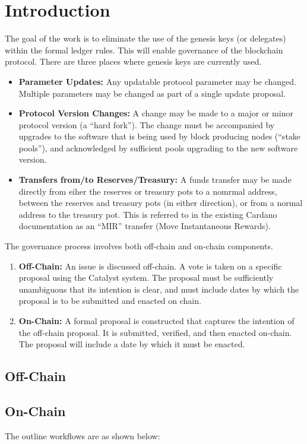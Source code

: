 \section{Introduction}

The goal of the work is to eliminate the use of the genesis keys (or delegates) within the formal ledger rules.  This will enable
governance of the blockchain protocol.   There are three places where genesis keys are currently used.


\begin{itemize}
\item
  \textbf{Parameter Updates:}
  Any updatable protocol parameter may be changed.  Multiple parameters may be changed as part of a single update proposal.
\item
  \textbf{Protocol Version Changes:}
  A change may be made to a major or minor protocol version (a ``hard fork'').  The change must be accompanied by upgrades to
  the software that is being used by block producing nodes (``stake pools''), and acknowledged by sufficient pools upgrading to the new software version.
\item
  \textbf{Transfers from/to Reserves/Treasury:}
  A funds transfer may be made directly from eiher the reserves or treasury pots to a nomrmal address, between the reserves and treasury pots (in either direction), or from a normal address to the treasury pot.  This is referred to in the existing Cardano documentation as an ``MIR'' transfer (Move Instantaneous Rewards).
\end{itemize}

The governance process involves both off-chain and on-chain components.

\begin{enumerate}
\item
  \textbf{Off-Chain:}
  An issue is discussed off-chain.  A vote is taken on a specific proposal using the Catalyst system.  The proposal must be sufficiently unambiguous that its intention is clear, and must include dates by which the proposal is to be submitted and enacted on chain.
\item
  \textbf{On-Chain:}
  A formal proposal is constructed that captures the intention of the off-chain proposal.  It is submitted, verified, and then enacted on-chain.  The proposal will include a date by which it must be enacted.
\end{enumerate}

\subsection{Off-Chain}

\subsection{On-Chain}


The outline workflows are as shown below:

\begin{figure}
\end{figure}
